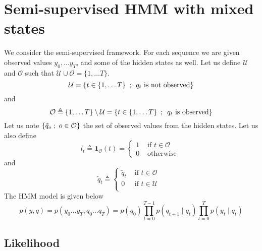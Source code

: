 \documentclass[a4paper, 11pt]{article}
\newcommand{\set}[2]{\left\{ #1 \hspace{.5em} ; \hspace{.5em}#2 \right\}}
\newcommand{\eqdef}{\triangleq}
\newcommand{\ssemi}{\hspace{.3em};\hspace{.3em}}
\begin{document}
\section{Semi-supervised HMM with mixed states}

We consider the semi-supervised framework. For each sequence we are
given observed values $y_0, \dots y_T$, and some of the hidden states
as well. Let us define $\mathcal{U}$ and $\mathcal{O}$ such that
$\mathcal{U} \cup \mathcal{O} = \{1, \dots T\}$.
\begin{displaymath}
  \mathcal{U} = \set{t \in \{1, \dots T\}}{\text{$q_t$ is not observed}}
\end{displaymath}
and
\begin{displaymath}
  \mathcal{O} \eqdef \{1, \dots T\} \setminus \mathcal{U} = \set{t \in \{1, \dots T\}}{\text{$q_t$ is observed}}
\end{displaymath}
Let us note $\{\tilde{q}_o \ssemi o \in \mathcal{O}\}$ the set of observed
values from the hidden states. Let us also define
\begin{displaymath}
  l_{t} \eqdef \mathbf{1}_\mathcal{O}(t) = \left\{
    \begin{array}{ll}
      1 &\text{ if $t \in \mathcal{O}$ }\\
      0 &\text{ otherwise }
    \end{array}
  \right.
\end{displaymath}
and
\begin{displaymath}
  \tilde{q}_{t} \eqdef \left\{
    \begin{array}{ll}
      \tilde{q}_t &\text{ if $t \in \mathcal{O}$ }\\
      0 &\text{ if $t \in \mathcal{U}$ }\\
    \end{array}
  \right.
\end{displaymath}
The HMM model is given below
\begin{displaymath}
  p(y, q) = p(y_0 \dots y_T, q_0 \dots q_T) = p(q_0) \prod_{t = 0}^{T-1} p(q_{t+1} \mid q_t) \prod_{t = 0}^{T} p(y_t \mid q_t)
\end{displaymath}

\subsection{Likelihood}
\end{document}

